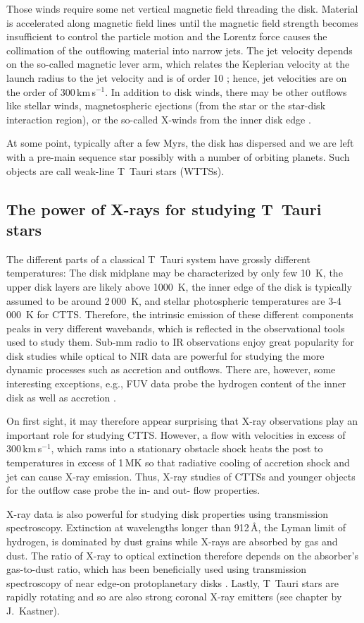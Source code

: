 Those winds require some net vertical magnetic field threading the disk. Material is accelerated along magnetic field lines until the magnetic field strength becomes insufficient to control the particle motion and the Lorentz force causes the collimation of the outflowing material into narrow jets. The jet velocity depends on the so-called magnetic lever arm, which relates the Keplerian velocity at the launch radius to the jet velocity and is of order 10 \citep{}; hence, jet velocities are on the order of 300\,km\,s$^{-1}$. In addition to disk winds, there may be other outflows like stellar winds, magnetospheric ejections (from the star or the star-disk interaction region), or the so-called X-winds from the inner disk edge \citep{Shu_1994}.

At some point, typically after a few Myrs, the disk has dispersed \citep{2009AIPC.1158....3M} and we are left with a pre-main sequence star possibly with a number of orbiting planets. Such objects are call weak-line T~Tauri stars (WTTSs).

\subsection{The power of X-rays for studying T~Tauri stars}
The different parts of a classical T~Tauri system have grossly different temperatures: The disk midplane may be characterized by only few 10~K, the upper disk layers are likely above 1000~K, the inner edge of the disk is typically assumed to be around 2\,000~K, and stellar photospheric temperatures are 3-4\,000~K for CTTS. Therefore, the intrinsic emission of these different components peaks in very different wavebands, which is reflected in the observational tools used to study them. Sub-mm radio to IR observations enjoy great popularity for disk studies while optical to NIR data are powerful for studying the more dynamic processes such as accretion and outflows. There are, however, some interesting exceptions, e.g., FUV data probe the hydrogen content of the inner disk as well as accretion \citep[see review by][]{Schneider_2020}.

On first sight, it may therefore appear surprising that X-ray observations play an important role for studying CTTS. However, a flow with velocities in excess of 300\,km\,s$^{-1}$, which rams into a stationary obstacle shock heats the post to temperatures in excess of 1\,MK  so that radiative cooling of accretion shock and jet can cause X-ray emission. Thus,  X-ray studies of CTTSs and younger objects for the outflow case probe the in- and out- flow properties.

X-ray data is also powerful for studying disk properties using transmission spectroscopy. Extinction at wavelengths longer than 912\,\AA{}, the Lyman limit of hydrogen, is dominated by dust grains while X-rays are absorbed by gas and dust. The ratio of X-ray to optical extinction therefore depends on the absorber's gas-to-dust ratio, which has been beneficially used using transmission spectroscopy of near edge-on protoplanetary disks \citep{}. Lastly, T~Tauri stars are rapidly rotating and so are also strong coronal X-ray emitters (see chapter by J.~Kastner).
